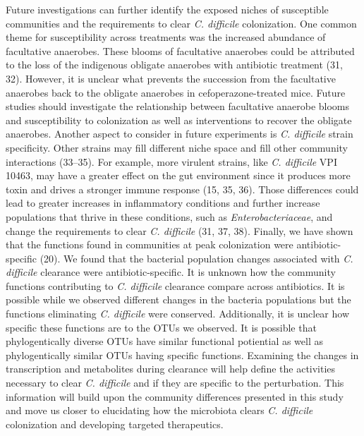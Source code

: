 \documentclass[12pt,]{article}
\begin{document}
Future investigations can further identify the exposed niches of
susceptible communities and the requirements to clear \emph{C.
difficile} colonization. One common theme for susceptibility across
treatments was the increased abundance of facultative anaerobes. These
blooms of facultative anaerobes could be attributed to the loss of the
indigenous obligate anaerobes with antibiotic treatment (31, 32).
However, it is unclear what prevents the succession from the facultative
anaerobes back to the obligate anaerobes in cefoperazone-treated mice.
Future studies should investigate the relationship between facultative
anaerobe blooms and susceptibility to colonization as well as
interventions to recover the obligate anaerobes. Another aspect to
consider in future experiments is \emph{C. difficile} strain
specificity. Other strains may fill different niche space and fill other
community interactions (33--35). For example, more virulent strains,
like \emph{C. difficile} VPI 10463, may have a greater effect on the gut
environment since it produces more toxin and drives a stronger immune
response (15, 35, 36). Those differences could lead to greater increases
in inflammatory conditions and further increase populations that thrive
in these conditions, such as \emph{Enterobacteriaceae}, and change the
requirements to clear \emph{C. difficile} (31, 37, 38). Finally, we have
shown that the functions found in communities at peak colonization were
antibiotic-specific (20). We found that the bacterial population changes
associated with \emph{C. difficile} clearance were antibiotic-specific.
It is unknown how the community functions contributing to \emph{C.
difficile} clearance compare across antibiotics. It is possible while we
observed different changes in the bacteria populations but the functions
eliminating \emph{C. difficile} were conserved. Additionally, it is
unclear how specific these functions are to the OTUs we observed. It is
possible that phylogentically diverse OTUs have similar functional
potiential as well as phylogentically similar OTUs having specific
functions. Examining the changes in transcription and metabolites during
clearance will help define the activities necessary to clear \emph{C.
difficile} and if they are specific to the perturbation. This
information will build upon the community differences presented in this
study and move us closer to elucidating how the microbiota clears
\emph{C. difficile} colonization and developing targeted therapeutics.
\end{document}
